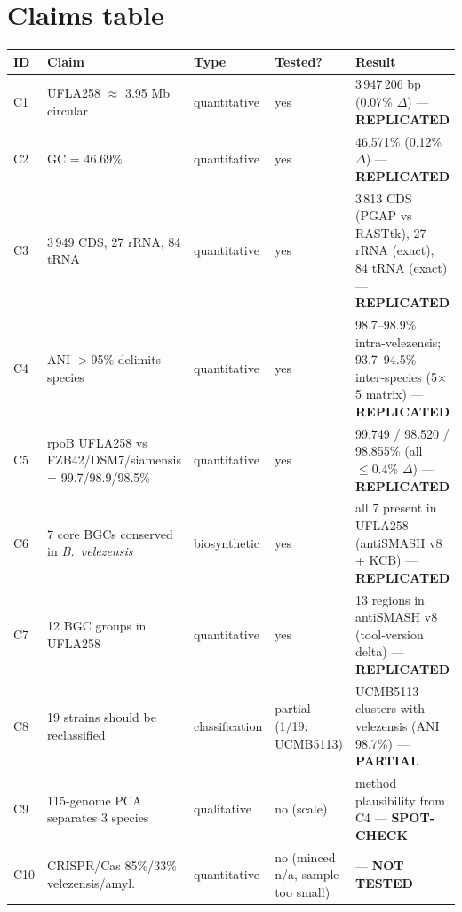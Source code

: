 \documentclass[11pt]{article}
\begin{document}
\section{Claims table}
\begin{tabularx}{\textwidth}{@{}llllX@{}}
\toprule
ID & Claim & Type & Tested? & Result \\
\midrule
C1 & UFLA258 $\approx$ 3.95 Mb circular & quantitative & yes & 3\,947\,206 bp (0.07\% $\Delta$) --- \textbf{REPLICATED} \\
C2 & GC = 46.69\% & quantitative & yes & 46.571\% (0.12\% $\Delta$) --- \textbf{REPLICATED} \\
C3 & 3\,949 CDS, 27 rRNA, 84 tRNA & quantitative & yes & 3\,813 CDS (PGAP vs RASTtk), 27 rRNA (exact), 84 tRNA (exact) --- \textbf{REPLICATED} \\
C4 & ANI $>$95\% delimits species & quantitative & yes & 98.7--98.9\% intra-velezensis; 93.7--94.5\% inter-species (5$\times$5 matrix) --- \textbf{REPLICATED} \\
C5 & rpoB UFLA258 vs FZB42/DSM7/siamensis = 99.7/98.9/98.5\% & quantitative & yes & 99.749 / 98.520 / 98.855\% (all $\leq 0.4\%$ $\Delta$) --- \textbf{REPLICATED} \\
C6 & 7 core BGCs conserved in \textit{B.\ velezensis} & biosynthetic & yes & all 7 present in UFLA258 (antiSMASH v8 + KCB) --- \textbf{REPLICATED} \\
C7 & 12 BGC groups in UFLA258 & quantitative & yes & 13 regions in antiSMASH v8 (tool-version delta) --- \textbf{REPLICATED} \\
C8 & 19 strains should be reclassified & classification & partial (1/19: UCMB5113) & UCMB5113 clusters with velezensis (ANI 98.7\%) --- \textbf{PARTIAL} \\
C9 & 115-genome PCA separates 3 species & qualitative & no (scale) & method plausibility from C4 --- \textbf{SPOT-CHECK} \\
C10 & CRISPR/Cas 85\%/33\% velezensis/amyl. & quantitative & no (minced n/a, sample too small) & --- \textbf{NOT TESTED} \\
\bottomrule
\end{tabularx}
\end{document}

